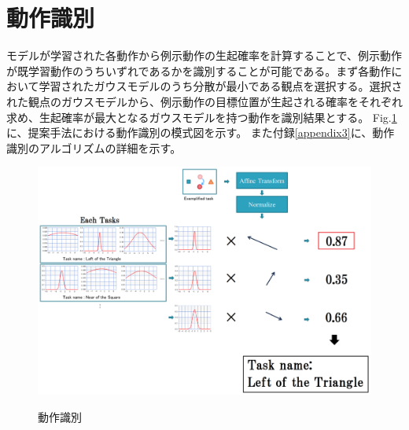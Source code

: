 \section{動作識別}

モデルが学習された各動作から例示動作の生起確率を計算することで、例示動作が既学習動作のうちいずれであるかを識別することが可能である。まず各動作において学習されたガウスモデルのうち分散が最小である観点を選択する。選択された観点のガウスモデルから、例示動作の目標位置が生起される確率をそれぞれ求め、生起確率が最大となるガウスモデルを持つ動作を識別結果とする。
Fig.\ref{figure:identification_model}に、提案手法における動作識別の模式図を示す。
また付録\ref{appendix3}に、動作識別のアルゴリズムの詳細を示す。
	\begin{figure}[h]
		\begin{center}
			\includegraphics[width=17cm]{chart10.png} \\ %
			\caption{動作識別}
			\label{figure:identification_model}
		\end{center}
	\end{figure}
